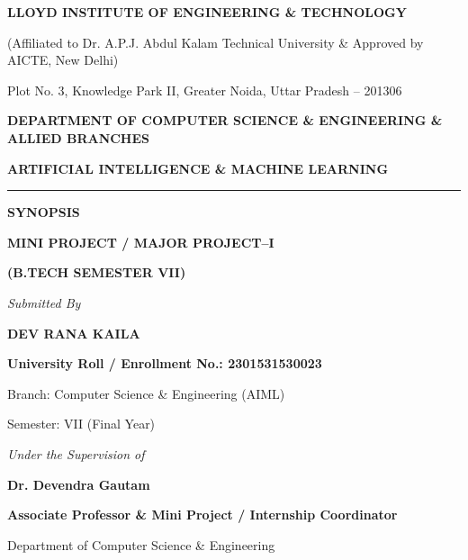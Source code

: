 \documentclass[12pt,a4paper]{report}
\begin{document}
\begin{titlepage}
    \centering
    {\LARGE \textbf{LLOYD INSTITUTE OF ENGINEERING \& TECHNOLOGY}\par}
    \vspace{0.2cm}
    {\small (Affiliated to Dr. A.P.J. Abdul Kalam Technical University \& Approved by AICTE, New Delhi)\par}
    {\small Plot No. 3, Knowledge Park II, Greater Noida, Uttar Pradesh -- 201306\par}
    \vspace{0.4cm}
    {\large \textbf{DEPARTMENT OF COMPUTER SCIENCE \& ENGINEERING \& ALLIED BRANCHES}\par}
    {\textbf{ARTIFICIAL INTELLIGENCE \& MACHINE LEARNING}\par}
    \vspace{0.4cm}
    \rule{\textwidth}{1pt}
    \vspace{0.5cm}
    {\huge \textbf{SYNOPSIS}\par}
    \vspace{0.2cm}
    {\Large \textbf{MINI PROJECT / MAJOR PROJECT--I}\par}
    {\large \textbf{(B.TECH SEMESTER VII)}\par}
    \vspace{1.0cm}

    
    \vspace{1.5cm}
    {\textit{Submitted By}\par}
    \vspace{0.2cm}
    {\Large \textbf{DEV RANA KAILA}\par}
    {\textbf{University Roll / Enrollment No.: 2301531530023}\par}
    {Branch: Computer Science \& Engineering (AIML)\par}
    {Semester: VII (Final Year)\par}
    \vspace{1.0cm}

    {\textit{Under the Supervision of}\par}
    \vspace{0.2cm}
    {\Large \textbf{Dr. Devendra Gautam}\par}
    {\textbf{Associate Professor \& Mini Project / Internship Coordinator}\par}
    {Department of Computer Science \& Engineering\par}
    \vfill


\end{titlepage}
\end{document}
